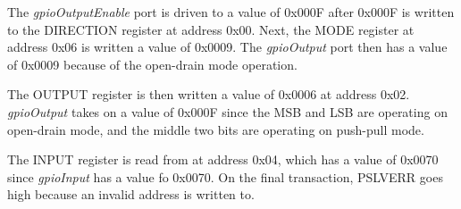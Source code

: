 The \textit{gpioOutputEnable} port is driven to a value of 0x000F after 0x000F is written to the DIRECTION register 
at address 0x00. Next, the MODE register at address 0x06 is written a value of 0x0009. The \textit{gpioOutput} port 
then has a value of 0x0009 because of the open-drain mode operation. 

The OUTPUT register is then written a value of 0x0006 at address 0x02. \textit{gpioOutput} takes on a value of 0x000F
since the MSB and LSB are operating on open-drain mode, and the middle two bits are operating on push-pull mode. 

The INPUT register is read from at address 0x04, which has a value of 0x0070 since \textit{gpioInput} has a value fo 0x0070.
On the final transaction, PSLVERR goes high because an invalid address is written to.
